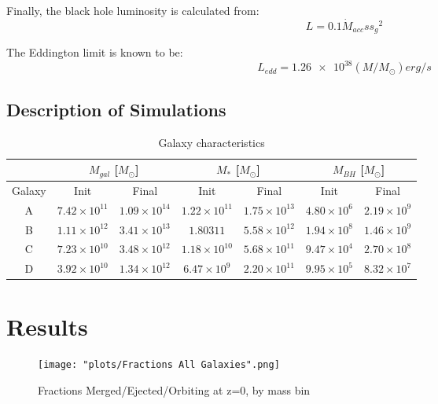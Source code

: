 \documentclass[english, apj]{emulateapj}
\begin{document}
Finally, the black hole luminosity is calculated from:
\begin{equation}
    L = 0.1\dot{M}_{acc}{ss_g}^2
\end{equation}

The Eddington limit is known to be:
\begin{equation}
    L_{edd} = \num{1.26e38} (M/M_{\odot}) erg/s
\end{equation}

\subsection{Description of Simulations}
\begin{table}
\centering
\caption{Galaxy characteristics}
\begin{tabular}{c| c c| c c| c c}
 & \multicolumn{2}{c}{$M_{gal}$ [$M_{\odot}$]} & 
\multicolumn{2}{c}{$M_{*}$ [$M_{\odot}$]} & 
\multicolumn{2}{c}{$M_{BH}$ [$M_{\odot}$]} \\
\hline
Galaxy & Init & Final & Init & Final & Init & Final \\
 \hline
A & $7.42\times10^{11}$ & $1.09\times10^{14}$  & $1.22\times10^{11}$ & $1.75\times10^{13}$ & $4.80\times10^{6}$ & $2.19\times10^{9}$\\
B & $1.11\times10^{12}$ & $3.41\times10^{13}$ & $1.80\mathrm{3}{11}$ & $5.58\times10^{12}$ & $1.94\times10^{8}$ & $1.46\times10^{9}$\\
C & $7.23\times10^{10}$ & $3.48\times10^{12}$ & $1.18\times10^{10}$ & $5.68\times10^{11}$ & $9.47\times10^{4}$ & $2.70\times10^{8}$\\
D & $3.92\times10^{10}$ & $1.34\times10^{12}$ & $6.47\times10^{9}$ & $2.20\times10^{11}$ & $9.95\times10^{5}$ & $8.32\times10^{7}$\\
\end{tabular}
\end{table}





\section{Results}\label{sec:results}
\begin{figure}[ht]
\begin{center}
\texttt{[image: "plots/Fractions All Galaxies".png]}
\caption{Fractions Merged/Ejected/Orbiting at z=0, by mass bin}
\label{fig:fmeo}
\end{center}
\end{figure}
\end{document}
